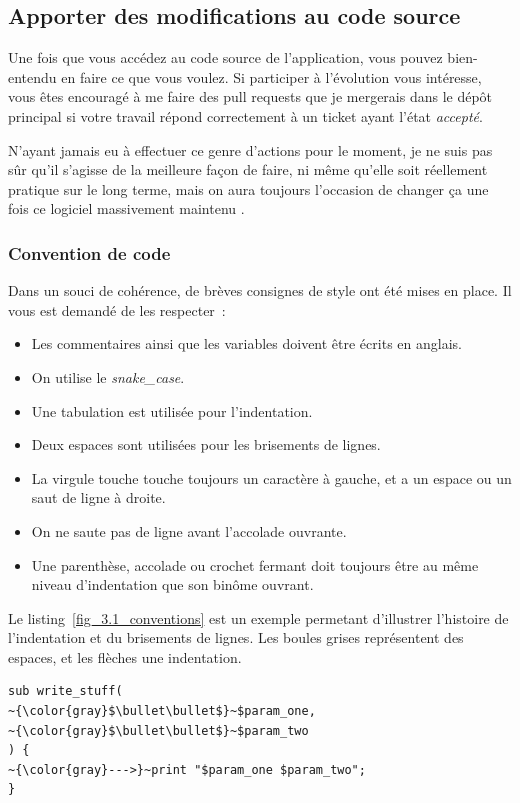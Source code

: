 \subsection{Apporter des modifications au code source}

Une fois que vous accédez au code source de l'application, vous pouvez bien-entendu en faire ce que vous voulez.
Si participer à l'évolution vous intéresse, vous êtes encouragé à me faire des pull requests que je mergerais dans le dépôt principal si votre travail répond correctement à un ticket ayant l'état \emph{accepté}.

N'ayant jamais eu à effectuer ce genre d'actions pour le moment, je ne suis pas sûr qu'il s'agisse de la meilleure façon de faire, ni même qu'elle soit réellement pratique sur le long terme, mais on aura toujours l'occasion de changer ça une fois ce logiciel massivement maintenu \Winkey.

\subsubsection{Convention de code}
Dans un souci de cohérence, de brèves consignes de style ont été mises en place. Il vous est demandé de les respecter~:
\begin{itemize}
	\item Les commentaires ainsi que les variables doivent être écrits en anglais.
	\item On utilise le \emph{snake\_case}.
	\item Une tabulation est utilisée pour l'indentation.
	\item Deux espaces sont utilisées pour les brisements de lignes.
	\item La virgule touche touche toujours un caractère à gauche, et a un espace ou un saut de ligne à droite.
	\item On ne saute pas de ligne avant l'accolade ouvrante.
	\item Une parenthèse, accolade ou crochet fermant doit toujours être au même niveau d'indentation que son binôme ouvrant.
\end{itemize}

Le listing~\ref{fig_3.1_conventions} est un exemple permetant d'illustrer l'histoire de l'indentation et du brisements de lignes.
Les boules grises représentent des espaces, et les flèches une indentation.

\begin{lstlisting}[basicstyle=\normalsize, caption={Conventions de code}, label=fig_3.1_conventions]
sub write_stuff(
~{\color{gray}$\bullet\bullet$}~$param_one,
~{\color{gray}$\bullet\bullet$}~$param_two
) {
~{\color{gray}--->}~print "$param_one $param_two";
}
\end{lstlisting}

